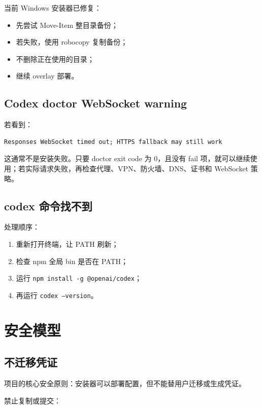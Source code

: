 \documentclass[11pt,a4paper]{ctexbook}
\begin{document}
当前 Windows 安装器已修复：

\begin{itemize}[leftmargin=2em]
  \item 先尝试 Move-Item 整目录备份；
  \item 若失败，使用 robocopy 复制备份；
  \item 不删除正在使用的目录；
  \item 继续 overlay 部署。
\end{itemize}

\section{Codex doctor WebSocket warning}

若看到：

\begin{lstlisting}[language={}]
Responses WebSocket timed out; HTTPS fallback may still work
\end{lstlisting}

这通常不是安装失败。只要 doctor exit code 为 0，且没有 fail 项，就可以继续使用；若实际请求失败，再检查代理、VPN、防火墙、DNS、证书和 WebSocket 策略。

\section{codex 命令找不到}

处理顺序：

\begin{enumerate}[leftmargin=2em]
  \item 重新打开终端，让 PATH 刷新；
  \item 检查 npm 全局 bin 是否在 PATH；
  \item 运行 \texttt{npm install -g @openai/codex}；
  \item 再运行 \texttt{codex --version}。
\end{enumerate}

\chapter{安全模型}

\section{不迁移凭证}

项目的核心安全原则：安装器可以部署配置，但不能替用户迁移或生成凭证。

禁止复制或提交：
\end{document}
